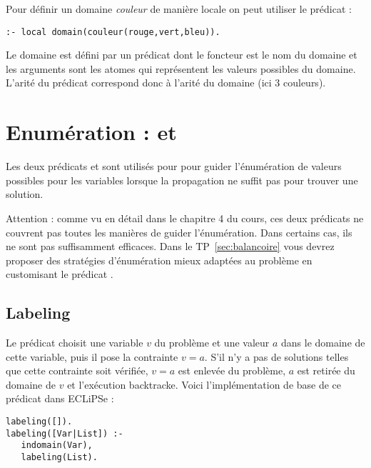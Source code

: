 Pour définir un domaine \emph{couleur} de manière locale on peut
utiliser le prédicat :
\begin{verbatim}
:- local domain(couleur(rouge,vert,bleu)).
\end{verbatim}

Le domaine est défini par un prédicat dont le foncteur est le nom du
domaine et les arguments sont les atomes qui représentent les valeurs
possibles du domaine. L'arité du prédicat correspond donc à l'arité du
domaine (ici 3 couleurs).


\section{Enumération :   et }
\label{intro:labeling}

Les deux prédicats  et  sont utilisés pour
pour guider l'énumération de valeurs possibles pour les variables
lorsque la propagation ne suffit pas pour trouver une solution.

Attention : comme vu en détail dans le chapitre 4 du cours, ces deux
prédicats ne couvrent pas toutes les manières de guider
l'énumération. Dans certains cas, ils ne sont pas suffisamment
efficaces. Dans le TP~\ref{sec:balancoire} vous devrez proposer des
stratégies d'énumération mieux adaptées au problème en customisant le
prédicat .


\subsection{Labeling}
Le prédicat  choisit une variable $v$ du problème et une
valeur $a$ dans le domaine de cette variable, puis il pose la
contrainte $v = a$. S'il n'y a pas de solutions telles que cette
contrainte soit vérifiée, $v = a$ est enlevée du problème, $a$ est
retirée du domaine de $v$ et l'exécution backtracke.  Voici
l'implémentation de base de ce prédicat dans ECLiPSe :

\begin{verbatim}
labeling([]).
labeling([Var|List]) :- 
   indomain(Var),
   labeling(List).
\end{verbatim}

